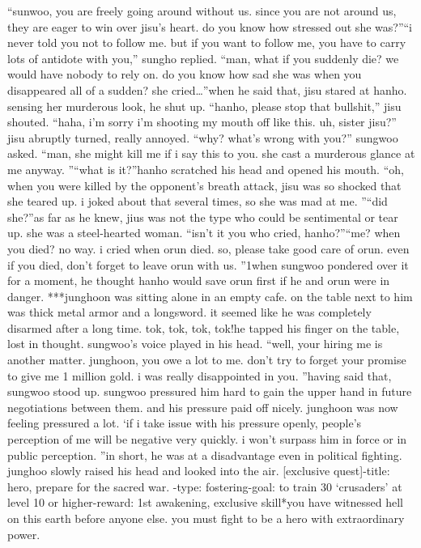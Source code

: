 “sunwoo, you are freely going around without us.
 since you are not around us, they are eager to win over jisu’s heart.
 do you know how stressed out she was?”“i never told you not to follow me.
 but if you want to follow me, you have to carry lots of antidote with you,” sungho replied.
“man, what if you suddenly die? we would have nobody to rely on.
 do you know how sad she was when you disappeared all of a sudden? she cried…”when he said that, jisu stared at hanho.
 sensing her murderous look, he shut up.
“hanho, please stop that bullshit,” jisu shouted.
“haha, i’m sorry i’m shooting my mouth off like this.
 uh, sister jisu?”
jisu abruptly turned, really annoyed.
“why? what’s wrong with you?” sungwoo asked.
“man, she might kill me if i say this to you.
 she cast a murderous glance at me anyway.
”“what is it?”hanho scratched his head and opened his mouth.
“oh, when you were killed by the opponent’s breath attack, jisu was so shocked that she teared up.
 i joked about that several times, so she was mad at me.
”“did she?”as far as he knew, jius was not the type who could be sentimental or tear up.
 she was a steel-hearted woman.
“isn’t it you who cried, hanho?”“me? when you died? no way.
 i cried when orun died.
 so, please take good care of orun.
 even if you died, don’t forget to leave orun with us.
”1when sungwoo pondered over it for a moment, he thought hanho would save orun first if he and orun were in danger.
***junghoon was sitting alone in an empty cafe.
 on the table next to him was thick metal armor and a longsword.
 it seemed like he was completely disarmed after a long time.
tok, tok, tok, tok!he tapped his finger on the table, lost in thought.
 sungwoo’s voice played in his head.
“well, your hiring me is another matter.
 junghoon, you owe a lot to me.
 don’t try to forget your promise to give me 1 million gold.
 i was really disappointed in you.
”having said that, sungwoo stood up.
 sungwoo pressured him hard to gain the upper hand in future negotiations between them.
and his pressure paid off nicely.
 junghoon was now feeling pressured a lot.
‘if i take issue with his pressure openly, people’s perception of me will be negative very quickly.
 i won’t surpass him in force or in public perception.
”in short, he was at a disadvantage even in political fighting.
junghoo slowly raised his head and looked into the air.
[exclusive quest]-title: hero, prepare for the sacred war.
-type: fostering-goal: to train 30 ‘crusaders’ at level 10 or higher-reward: 1st awakening, exclusive skill*you have witnessed hell on this earth before anyone else.
 you must fight to be a hero with extraordinary power.

